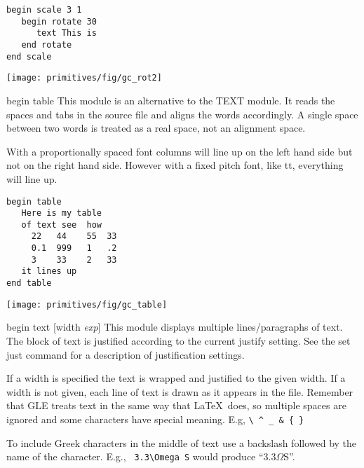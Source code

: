 \begin{commanddescription}
\begin{minipage}[c]{8cm}
\begin{Verbatim}
begin scale 3 1 
   begin rotate 30
      text This is
   end rotate
end scale
\end{Verbatim}
\end{minipage}
\hfill
\begin{minipage}[c]{7cm}
\mbox{\texttt{[image: primitives/fig/gc\_rot2]}}
\end{minipage}

\pagebreak[2]

\item[{\sf begin table }]
  This module is an alternative
to the TEXT module.  It reads
the spaces and tabs in the source file and aligns the words
accordingly.  A single space between two words
is treated as a real space, not an alignment space.

With a proportionally spaced font columns will line
up on the left hand side but not on the right hand side.
However with a fixed pitch font, like {\sf tt},
everything will line up.

\begin{minipage}[c]{8cm}
\begin{Verbatim}
begin table 
   Here is my table
   of text see  how 
     22   44    55  33
     0.1  999   1   .2
     3    33    2   33
   it lines up
end table
\end{Verbatim}
\end{minipage}
\hfill
\begin{minipage}[c]{7cm}
\mbox{\texttt{[image: primitives/fig/gc\_table]}}
\end{minipage}

\item[{\sf begin text [width {\it exp}] }  ]
 This module displays multiple lines/paragraphs of text.
The block of text is justified according to the current justify setting.
See the {\sf set just} command for a description of justification settings.

If a width is specified the text is wrapped and justified
to the given width.  If a width is not given, each line of text
is drawn as it appears in the file.  Remember that GLE treats
text in the same way that \LaTeX \ does, so multiple spaces are ignored
and some characters have special meaning. E.g, \verb#\ ^ _ & { }#

To include Greek characters in the middle of text use a
backslash followed by the name of the character.
E.g., \verb+ 3.3\Omega S+ would produce ``3.3$\Omega$S''.


\end{commanddescription}
